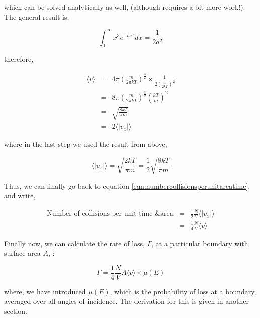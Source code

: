 \documentclass[11pt,a4paper,oneside]{article}
\begin{document}
which can be solved analytically as well, (although requires a bit more work!). The general result is, 

\begin{equation}
\int_{0}^{\infty} x^{3} e^{-ax^{2}} dx = \frac{1}{2a^{2}}
\end{equation}

therefore, 

\begin{eqnarray*}
\langle v \rangle &=& 4\pi \left(\frac{m}{2\pi k T}\right)^{\frac{3}{2}} \times \frac{1}{2(\frac{m}{2kT})^{2}} \\
&=& 8\pi \left(\frac{m}{2\pi k T}\right)^{\frac{3}{2}}\left( \frac{kT}{m} \right)^{2} \\
&=& \sqrt{\frac{8kT}{\pi m}} \\
&=& 2 \langle |v_{x}| \rangle 
\end{eqnarray*}

where in the last step we used the result from above, 

\begin{equation}
\langle |v_{x}| \rangle = \sqrt{\frac{2kT}{\pi m}} = \frac{1}{2}\sqrt{\frac{8kT}{\pi m}}
\end{equation}

Thus, we can finally go back to equation \ref{eqn:numbercollisionsperunitareatime}, and write, 

\begin{eqnarray*}
\mbox{Number of collisions per unit time \& area} &=& \frac{1}{2}\frac{N}{V} \langle |v_{x}| \rangle \\
&=& \frac{1}{4}\frac{N}{V}\langle v \rangle
\end{eqnarray*}

Finally now, we can calculate the rate of loss, $\Gamma$, at a particular boundary with surface area $A$, :

\begin{equation}
\Gamma = \frac{1}{4}\frac{N}{V}A\langle v \rangle \times \bar{\mu}(E)
\end{equation}

where, we have introduced $\bar{\mu}(E)$, which is the probability of loss at a boundary, averaged over all angles of incidence. The derivation for this is given in another section. 

\end{document}
